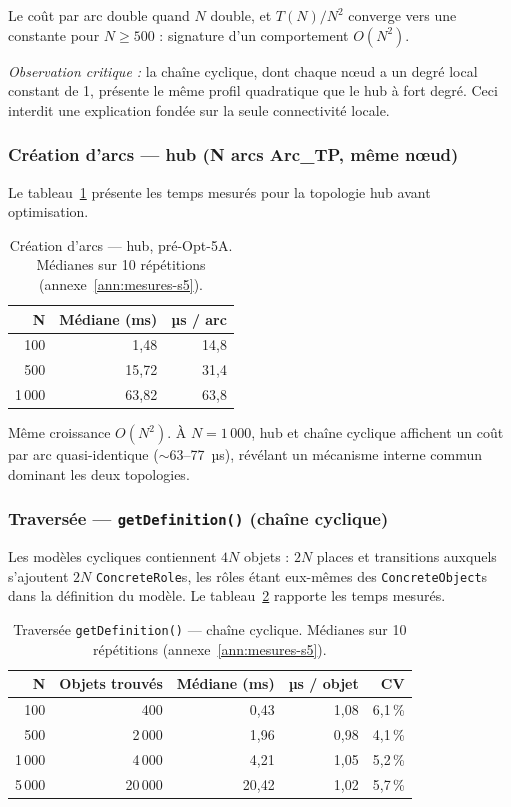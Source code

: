 Le coût par arc double quand $N$ double, et $T(N)/N^2$ converge vers une constante pour $N \geq 500$ : signature d'un comportement $O(N^2)$.

\textit{Observation critique :} la chaîne cyclique, dont chaque n\oe{}ud a un degré local constant de 1, présente le même profil quadratique que le hub à fort degré. Ceci interdit une explication fondée sur la seule connectivité locale.

\subsubsection{Création d'arcs — hub (N arcs Arc\_TP, même n\oe{}ud)}

Le tableau~\ref{tab:sc5-arc-hub} présente les temps mesurés pour la
topologie hub avant optimisation.

\begin{table}[h]
\centering
\caption{Création d'arcs --- hub, pré-Opt-5A. Médianes sur 10
répétitions (annexe~\ref{ann:mesures-s5}).}
\label{tab:sc5-arc-hub}
\begin{tabular}{rrr}
\hline
\textbf{N} & \textbf{Médiane (ms)} & \textbf{µs / arc} \\
\hline
100   & 1,48  & 14,8 \\
500   & 15,72 & 31,4 \\
1\,000 & 63,82 & 63,8 \\
\hline
\end{tabular}
\end{table}

Même croissance $O(N^2)$. À $N = 1\,000$, hub et chaîne cyclique
affichent un coût par arc quasi-identique ($\sim$63--77~µs), révélant
un mécanisme interne commun dominant les deux topologies.

\subsubsection{Traversée — \texttt{getDefinition()} (chaîne cyclique)}

Les modèles cycliques contiennent $4N$ objets : $2N$ places et transitions auxquels s'ajoutent $2N$ \texttt{ConcreteRole}s, les rôles étant eux-mêmes des \texttt{ConcreteObject}s dans la définition du modèle. Le tableau~\ref{tab:sc5-traversal} rapporte les temps mesurés.

\begin{table}[h]
\centering
\caption{Traversée \texttt{getDefinition()} --- chaîne cyclique. Médianes
sur 10 répétitions (annexe~\ref{ann:mesures-s5}).}
\label{tab:sc5-traversal}
\begin{tabular}{rrrrr}
\hline
\textbf{N} & \textbf{Objets trouvés} & \textbf{Médiane (ms)} & \textbf{µs / objet} & \textbf{CV} \\
\hline
100    & 400     &  0,43 & 1,08 & 6,1\,\% \\
500    & 2\,000  &  1,96 & 0,98 & 4,1\,\% \\
1\,000 & 4\,000  &  4,21 & 1,05 & 5,2\,\% \\
5\,000 & 20\,000 & 20,42 & 1,02 & 5,7\,\% \\
\hline
\end{tabular}
\end{table}

